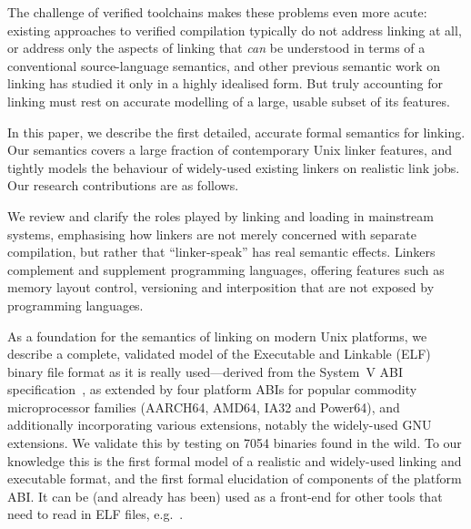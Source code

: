 The challenge of verified toolchains makes these problems even more acute: existing
approaches to verified compilation typically do not address linking at
all, or address only the aspects
of linking that \emph{can} be understood in terms of a conventional
source-language semantics, and other previous semantic work on linking
has studied it only in a highly idealised form. But 
truly accounting for linking must rest on accurate modelling of a large, usable subset of its features.

In this paper, we describe the first detailed, accurate formal semantics for linking. 
Our semantics covers a large fraction of contemporary Unix linker features, and tightly models the behaviour of widely-used existing linkers on realistic link jobs.
Our research contributions are as follows.

\begin{verytightitemize}
\item
We review and clarify the roles played by linking and loading in mainstream systems, emphasising
how linkers are not merely concerned with separate compilation, but rather that ``linker-speak'' has real semantic effects.
Linkers complement and supplement programming languages, offering
features such as memory layout control, versioning and interposition
that are not exposed by programming languages. %


\item As a foundation for the semantics of linking on modern Unix
  platforms, we describe a complete, validated  model of the
  Executable and Linkable (ELF) binary file format as it is really
  used---derived from the System~V ABI
  specification~\cite{elf-sco-model}, as extended by four platform ABIs
  for popular commodity microprocessor families (AARCH64, AMD64, IA32
  and Power64), and additionally incorporating various extensions,
  notably the widely-used GNU extensions.  
We validate this by testing on 7054 binaries found in the wild.
To our knowledge this is the first formal model of a realistic and
widely-used linking and executable format, and the first formal
elucidation of components of the platform ABI.  It can be (and already
has been) used as a front-end for other tools that need to read in ELF
files, e.g.~\cite{micro2016,FP16}.


\end{verytightitemize}
